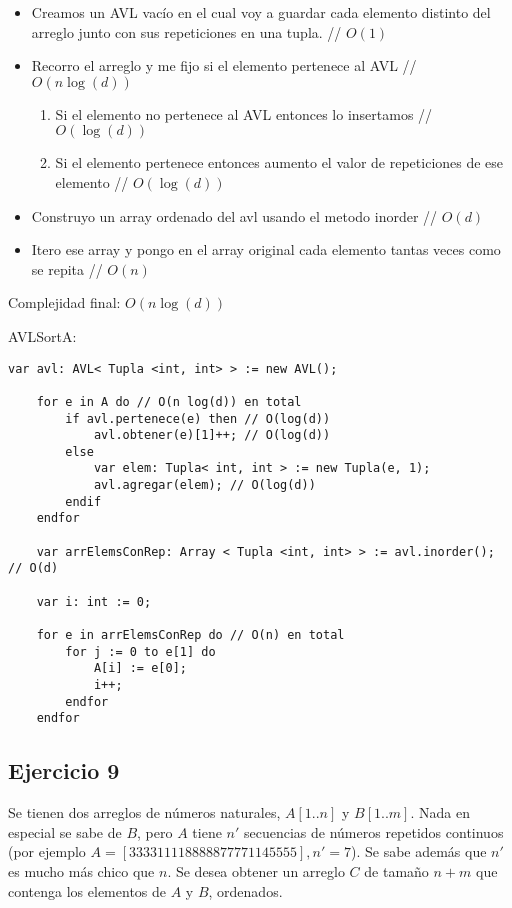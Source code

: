 \begin{itemize}
    \item Creamos un AVL vacío en el cual voy a guardar cada elemento distinto del arreglo junto con sus repeticiones en una tupla. // $O(1)$

    \item Recorro el arreglo y me fijo si el elemento pertenece al AVL // $O(n\log(d))$

          \begin{enumerate}
              \item Si el elemento no pertenece al AVL entonces lo insertamos // $O(\log(d))$
              \item Si el elemento pertenece entonces aumento el valor de repeticiones de ese elemento // $O(\log(d))$
          \end{enumerate}

    \item Construyo un array ordenado del avl usando el metodo inorder // $O(d)$
    \item Itero ese array y pongo en el array original cada elemento tantas veces como se repita // $O(n)$
\end{itemize}

Complejidad final: $O(n\log(d))$

\begin{proc}{AVLSort}{\Inout A: \Array{\Int}}{}
    \begin{lstlisting}[numbers=none,frame=none]
    var avl: AVL< Tupla <int, int> > := new AVL();

    for e in A do // O(n log(d)) en total
        if avl.pertenece(e) then // O(log(d))
            avl.obtener(e)[1]++; // O(log(d))
        else
            var elem: Tupla< int, int > := new Tupla(e, 1);
            avl.agregar(elem); // O(log(d))
        endif
    endfor

    var arrElemsConRep: Array < Tupla <int, int> > := avl.inorder(); // O(d)

    var i: int := 0;

    for e in arrElemsConRep do // O(n) en total
        for j := 0 to e[1] do
            A[i] := e[0];
            i++;
        endfor
    endfor
    \end{lstlisting}
\end{proc}

\subsection{Ejercicio 9}
Se tienen dos arreglos de números naturales, $A[1..n]$ y $B[1..m]$. Nada en especial se sabe de $B$, pero $A$ tiene $n'$ secuencias de números repetidos continuos (por ejemplo $A = [333311118888877771145555], n' = 7$). Se sabe además que $n'$ es mucho más chico que $n$. Se desea obtener un arreglo $C$ de tamaño $n+m$ que contenga los elementos de $A$ y $B$, ordenados.

